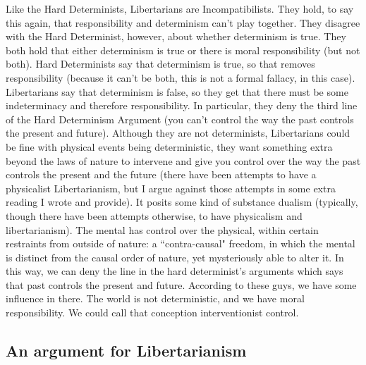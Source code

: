 Like the Hard Determinists, Libertarians are Incompatibilists. They hold, to say this again, that responsibility and determinism can't play together. They disagree with the Hard Determinist, however, about whether determinism is true. They both hold that either determinism is true or there is moral responsibility (but not both). Hard Determinists say that determinism is true, so that removes responsibility (because it can't be both, this is not a formal fallacy, in this case). Libertarians say that determinism is false, so they get that there must be some indeterminacy and therefore responsibility. In particular, they deny the third line of the Hard Determinism Argument (you can't control the way the past controls the present and future). Although they are not determinists, Libertarians could be fine with physical events being deterministic, they want something extra beyond the laws of nature to intervene and give you control over the way the past controls the present and the future (there have been attempts to have a physicalist Libertarianism, but I argue against those attempts in some extra reading I wrote and provide). It posits some kind of substance dualism (typically, though there have been attempts otherwise, to have physicalism and libertarianism). The mental has control over the physical, within certain restraints from outside of nature: a ``contra-causal" freedom, in which the mental is distinct from the causal order of nature, yet mysteriously able to alter it. In this way, we can deny the line in the hard determinist’s arguments which says that past controls the present and future. According to these guys, we have some influence in there. The world is not deterministic, and we have moral responsibility. We could call that conception interventionist control. 

\subsection{An argument for Libertarianism}


